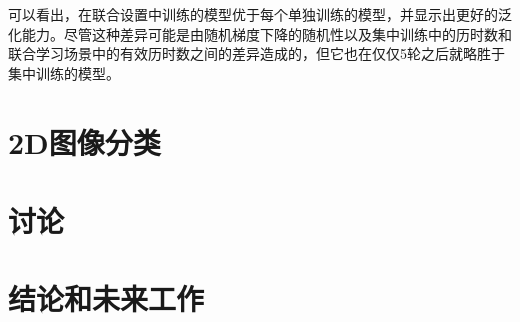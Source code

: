 可以看出，在联合设置中训练的模型优于每个单独训练的模型，并显示出更好的泛化能力。尽管这种差异可能是由随机梯度下降的随机性以及集中训练中的历时数和联合学习场景中的有效历时数之间的差异造成的，但它也在仅仅5轮之后就略胜于集中训练的模型。

\section{2D图像分类}

\section{讨论}

\section{结论和未来工作}
